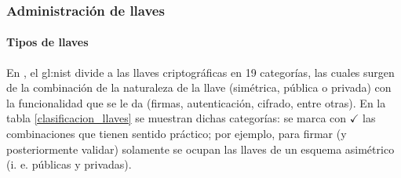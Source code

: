 %
%

\subsubsection{Administración de llaves}
\label{sec:administracion_llaves}

\paragraph{Tipos de llaves}

En \cite{nist_llaves}, el \gls{gl:nist} divide a las llaves criptográficas en
19 categorías, las cuales surgen de la combinación de la naturaleza de la
llave (simétrica, pública o privada) con la funcionalidad que se le da
(firmas, autenticación, cifrado, entre otras). En la tabla
\ref{clasificacion_llaves} se muestran dichas categorías: se marca con
$ \checkmark $ las combinaciones que tienen sentido práctico; por ejemplo, para
firmar (y posteriormente validar) solamente se ocupan las llaves de un esquema
asimétrico (i. e. públicas y privadas).


